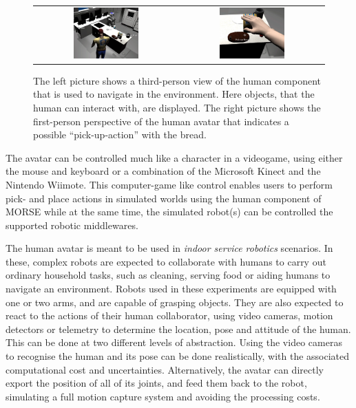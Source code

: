 \documentclass{llncs}
\begin{document}
\begin{figure}[ht!]
\centering
\begin{tabular}{cc}
 \includegraphics[width=0.475\textwidth]{pics/human_control_1.png} &
 \includegraphics[width=0.475\textwidth]{pics/human_control_2.png}
\end{tabular}
\caption{The left picture shows a third-person view of the human component that
    is used to navigate in the environment. Here objects, that the human can
    interact with, are displayed. The right picture shows the first-person
    perspective of the human avatar that indicates a possible
    ``pick-up-action'' with the bread.}
\label{fig:human_control}
\end{figure}

The avatar can be controlled much like a character in a videogame, using either
the mouse and keyboard or a combination of the Microsoft Kinect and the
Nintendo Wiimote. This computer-game like control enables users to perform
pick- and place actions in simulated worlds using the human component of MORSE
while at the same time, the simulated robot(s) can be controlled the supported
robotic middlewares.


The human avatar is meant to be used in \emph{indoor service robotics} scenarios.
In these, complex robots are expected to collaborate with humans to carry out
ordinary household tasks, such as cleaning, serving food or aiding humans to
navigate an environment.
Robots used in these experiments are equipped with one or two arms, and are
capable of grasping objects. They are also expected to react to the actions of
their human collaborator, using video cameras, motion detectors or telemetry to
determine the location, pose and attitude of the human.
This can be done at two different levels of
abstraction. Using the video cameras to recognise the human and its pose can be
done realistically, with the associated computational cost and uncertainties.
Alternatively, the avatar can directly export the position of all of its
joints, and feed them back to the robot, simulating a full motion capture
system and avoiding the processing costs.
\end{document}
